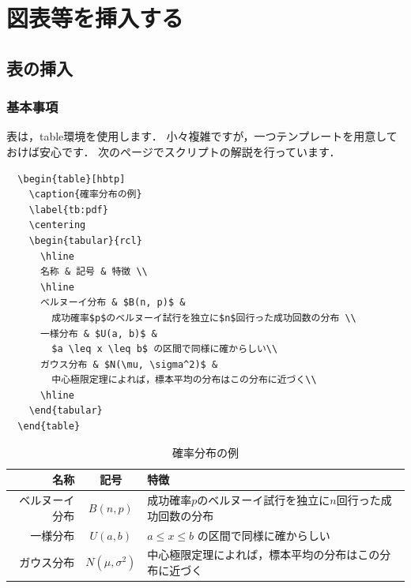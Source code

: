 \documentclass[11pt,a4j,onecolumn]{jsreport} %
\begin{document}

\chapter{図表等を挿入する}

\section{表の挿入}
\label{sec:table}

\subsection{基本事項}

表は，table環境を使用します．
小々複雑ですが，一つテンプレートを用意しておけば安心です．
次のページでスクリプトの解説を行っています．

\begin{verbatim}
  \begin{table}[hbtp]
    \caption{確率分布の例}
    \label{tb:pdf}
    \centering
    \begin{tabular}{rcl}
      \hline
      名称 & 記号 & 特徴 \\
      \hline
      ベルヌーイ分布 & $B(n, p)$ & 
        成功確率$p$のベルヌーイ試行を独立に$n$回行った成功回数の分布 \\
      一様分布 & $U(a, b)$ & 
        $a \leq x \leq b$ の区間で同様に確からしい\\
      ガウス分布 & $N(\mu, \sigma^2)$ & 
        中心極限定理によれば，標本平均の分布はこの分布に近づく\\
      \hline
    \end{tabular}
  \end{table}
\end{verbatim}


\begin{table}[hbtp]
  \caption{確率分布の例}
  \label{tb:pdf}
  \centering
  \begin{tabular}{rcl}
    \hline
    名称 & 記号 & 特徴 \\
    \hline
    ベルヌーイ分布 & $B(n, p)$ & 
      成功確率$p$のベルヌーイ試行を独立に$n$回行った成功回数の分布 \\
    一様分布 & $U(a, b)$ & 
      $a \leq x \leq b$ の区間で同様に確からしい\\
    ガウス分布 & $N(\mu, \sigma^2)$ & 
      中心極限定理によれば，標本平均の分布はこの分布に近づく\\
    \hline
  \end{tabular}
\end{table}
\end{document}
